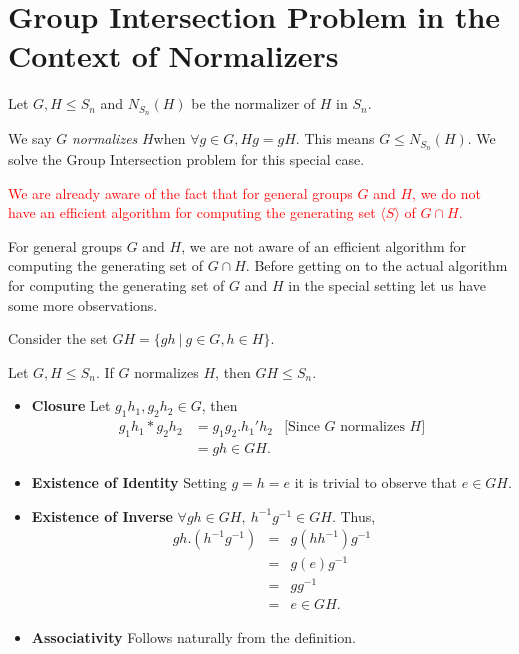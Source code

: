\section{Group Intersection Problem in the Context of Normalizers}

Let $G,H\leq S_n$ and $N_{S_{n}}(H)$ be the normalizer of $H$ in $S_n$. 

We say $G$ \emph{normalizes} $H$when $\forall g\in G, Hg = gH$. This means $G\leq N_{S_{n}}(H)$. We solve the Group Intersection problem
for this special case.

\textcolor{red}
{We are already aware of the fact that for general groups $G$ and $H$, we do not have an efficient algorithm for computing the generating set $\langle S\rangle$ of $G\cap H$.} 

For general groups $G$ and $H$, we are not aware of an efficient algorithm for computing the generating set of $G\cap H$. Before getting on to the actual algorithm for computing the generating set of $G$ and $H$ in the special setting let us have some more observations.

Consider the set $GH = \{gh~|~g\in G, h\in H\}$. 
\begin{observation}
\label{obs-GH}
Let $G,H\leq S_n$. If $G$ normalizes $H$, then $GH\leq S_n$.
\begin{itemize}
	\item {\bf Closure} Let $g_1h_1,g_2h_2\in G$, then
	\begin{eqnarray*}
		g_1h_1*g_2h_2 &= g_1g_2.h_1'h_2 & \text{[Since $G\text{ normalizes }H$]}\\
		&= gh\in GH.
	\end{eqnarray*}
	\item {\bf Existence of Identity} Setting $g = h = e$ it is trivial to observe that $e\in GH$.
	\item {\bf Existence of Inverse} $\forall gh\in GH,~ h^{-1}g^{-1}\in GH$. Thus,
	\begin{eqnarray*}
		gh.(h^{-1}g^{-1}) &=& g(hh^{-1})g^{-1}\\
						  &=& g(e)g^{-1}\\
						  &=& gg^{-1}\\
						  &=& e\in GH.
	\end{eqnarray*} 
	\item {\bf Associativity} Follows naturally from the definition.
\end{itemize}
\end{observation}


